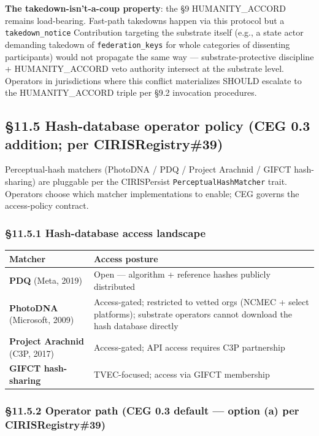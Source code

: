 \documentclass[10pt]{article}
\begin{document}
\textbf{The takedown-isn't-a-coup property}: the §9 HUMANITY\_ACCORD remains load-bearing. Fast-path takedowns happen via this protocol but a \texttt{takedown\_notice} Contribution targeting the substrate itself (e.g., a state actor demanding takedown of \texttt{federation\_keys} for whole categories of dissenting participants) would not propagate the same way — substrate-protective discipline + HUMANITY\_ACCORD veto authority intersect at the substrate level. Operators in jurisdictions where this conflict materializes SHOULD escalate to the HUMANITY\_ACCORD triple per §9.2 invocation procedures.


\subsection*{§11.5 Hash-database operator policy (CEG 0.3 addition; per CIRISRegistry\#39)}


Perceptual-hash matchers (PhotoDNA / PDQ / Project Arachnid / GIFCT hash-sharing) are pluggable per the CIRISPersist \texttt{PerceptualHashMatcher} trait. Operators choose which matcher implementations to enable; CEG governs the access-policy contract.


\subsubsection*{§11.5.1 Hash-database access landscape}


{\footnotesize
\begin{longtable}{|p{8.0cm}|p{8.0cm}|}\hline
\textbf{Matcher} & \textbf{Access posture} \\ \hline\endhead
\textbf{PDQ} (Meta, 2019) & Open — algorithm + reference hashes publicly distributed \\ \hline
\textbf{PhotoDNA} (Microsoft, 2009) & Access-gated; restricted to vetted orgs (NCMEC + select platforms); substrate operators cannot download the hash database directly \\ \hline
\textbf{Project Arachnid} (C3P, 2017) & Access-gated; API access requires C3P partnership \\ \hline
\textbf{GIFCT hash-sharing} & TVEC-focused; access via GIFCT membership \\ \hline
\end{longtable}}


\subsubsection*{§11.5.2 Operator path (CEG 0.3 default — option (a) per CIRISRegistry\#39)}
\end{document}
